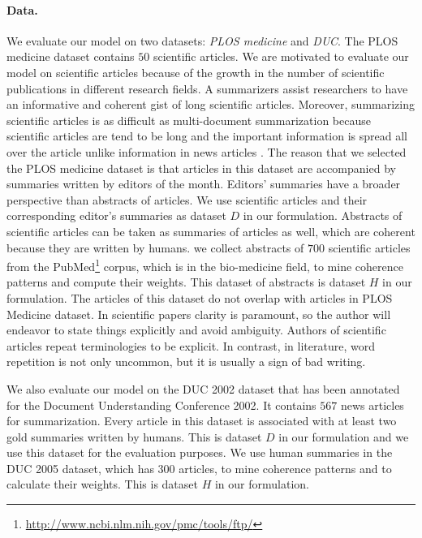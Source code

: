 \paragraph{Data.}
We evaluate our model on two datasets:  \emph{PLOS medicine} and \emph{DUC}. 
The PLOS medicine dataset contains $50$ scientific articles.  
We are motivated to evaluate our model on scientific articles because of the growth in the number of scientific publications in different research fields.  
A summarizers assist researchers to have an informative and coherent gist of long scientific articles. 
Moreover, summarizing scientific articles is as difficult as multi-document summarization because scientific articles are tend to be long and the important information is spread all over the article unlike information in news articles \cite{teufel02}. 
The reason that we selected the PLOS medicine dataset is that articles in this dataset are accompanied by summaries written by editors of the month. 
Editors' summaries have a broader perspective than abstracts of articles.  
We use scientific articles and their corresponding editor's summaries as dataset $D$ in our formulation.
Abstracts of scientific articles can be taken as summaries of articles as well, which are coherent because they are written by humans. 
we collect abstracts of $700$ scientific articles from the PubMed\footnote{\url{http://www.ncbi.nlm.nih.gov/pmc/tools/ftp/}} corpus, which is in the \mbox{bio-medicine} field, to mine coherence patterns and compute their weights. 
This dataset of abstracts is dataset $H$ in our formulation. 
The articles of this dataset do not overlap with articles in PLOS Medicine dataset. 
In scientific papers clarity is paramount, so the author will endeavor to state things explicitly and avoid ambiguity. 
Authors of scientific articles repeat terminologies to be explicit.     
In contrast, in literature, word repetition is not only uncommon, but it is usually a sign of bad writing. 

We also evaluate our model on the DUC 2002 dataset that has been annotated for the Document Understanding Conference 2002. 
It contains $567$ news articles for summarization. 
Every article in this dataset is associated with at least two gold summaries written by humans. 
This is dataset $D$ in our formulation and we use this dataset for the evaluation purposes. 
We use human summaries in the DUC 2005 dataset, which has $300$ articles, to mine coherence patterns and to calculate their weights. 
This is dataset $H$ in our formulation. 

